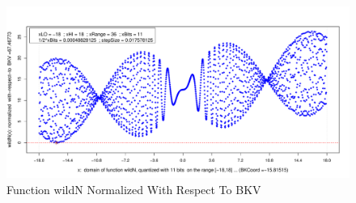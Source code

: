 \documentclass[11pt, oneside]{article}
\begin{document}
   \begin{figure}
     \centering
     \includegraphics[width=1\linewidth]{fg_OF_wildN_quant_exh.pdf}
    \caption{Function wildN Normalized With Respect To BKV}
   \end{figure}
   
\end{document}
